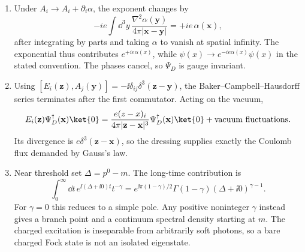 \begin{enumerate}
\begin{enumerate}
\item
Under \(A_i\to A_i+\partial_i\alpha\), the exponent changes by
\[
 -ie\int \dd^3y\,\frac{\nabla^2\alpha(\mathbf y)}
 {4\pi|\mathbf x-\mathbf y|}
 =+ie\,\alpha(\mathbf x),
\]
after integrating by parts and taking \(\alpha\) to vanish at spatial
infinity.  The exponential thus contributes \(e^{+ie\alpha(x)}\), while
\(\psi(x)\to e^{-ie\alpha(x)}\psi(x)\) in the stated convention.  The
phases cancel, so \(\Psi_D\) is gauge invariant.
\item
Using
\([E_i(\mathbf z),A_j(\mathbf y)]=-\ii\delta_{ij}\delta^3(\mathbf z-\mathbf y)\),
the Baker--Campbell--Hausdorff series terminates after the first
commutator.  Acting on the vacuum,
\[
 E_i(\mathbf z)\Psi_D^\dagger(\mathbf x)\ket{0}
 =\frac{e(z-x)_i}{4\pi|\mathbf z-\mathbf x|^3}
 \Psi_D^\dagger(\mathbf x)\ket{0}
 +\text{vacuum fluctuations}.
\]
Its divergence is
\(e\delta^3(\mathbf z-\mathbf x)\), so the dressing supplies exactly the
Coulomb flux demanded by Gauss's law.
\item
Near threshold set \(\Delta=p^0-m\).  The long-time contribution is
\[
 \int_0^\infty \dd t\,e^{\ii(\Delta+\ii0)t}t^{-\gamma}
 =e^{\ii\pi(1-\gamma)/2}\Gamma(1-\gamma)
 (\Delta+\ii0)^{\gamma-1}.
\]
For \(\gamma=0\) this reduces to a simple pole.  Any positive noninteger
\(\gamma\) instead gives a branch point and a continuum spectral density
starting at \(m\).  The charged excitation is inseparable from arbitrarily
soft photons, so a bare charged Fock state is not an isolated eigenstate.
\end{enumerate}


\end{enumerate}
